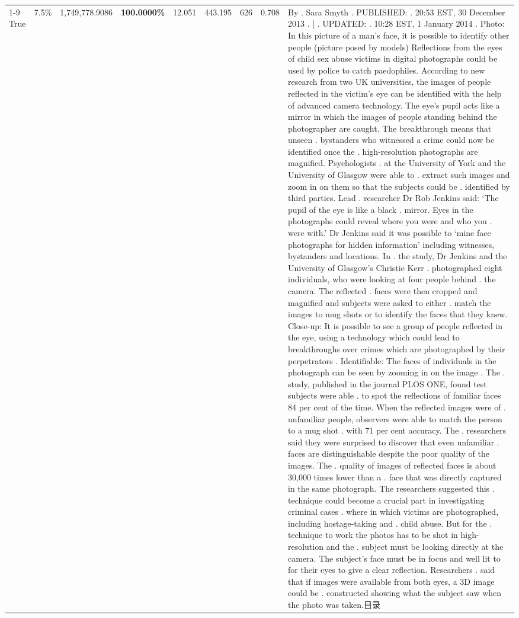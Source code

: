 \begin{table}[H]
\begin{tabular}{lllrlllll}
\cline{1-9}
True & 7.5\% & 1,749,778.9086 & \bfseries \color{red} 100.0000\% & 12.051 & 443.195 & 626 & 0.708 & By . Sara Smyth . PUBLISHED: . 20:53 EST, 30 December 2013 . | . UPDATED: . 10:28 EST, 1 January 2014 . Photo: In this picture of a man's face, it is possible to identify other people (picture posed by models) Reflections from the eyes of child sex abuse victims in digital photographs could be used by police to catch paedophiles. According to new research from two UK universities, the images of people reflected in the victim's eye can be identified with the help of advanced camera technology. The eye's pupil acts like a mirror in which the images of people standing behind the photographer are caught. The breakthrough means that unseen . bystanders who witnessed a crime could now be identified once the . high-resolution photographs are magnified. Psychologists . at the University of York and the University of Glasgow were able to . extract such images and zoom in on them so that the subjects could be . identified by third parties. Lead . researcher Dr Rob Jenkins said: ‘The pupil of the eye is like a black . mirror. Eyes in the photographs could reveal where you were and who you . were with.' Dr Jenkins said it was possible to ‘mine face photographs for hidden information' including witnesses, bystanders and locations. In . the study, Dr Jenkins and the University of Glasgow's Christie Kerr . photographed eight individuals, who were looking at four people behind . the camera. The reflected . faces were then cropped and magnified and subjects were asked to either . match the images to mug shots or to identify the faces that they knew. Close-up: It is possible to see a group of people reflected in the eye, using a technology which could lead to breakthroughs over crimes which are photographed by their perpetrators . Identifiable: The faces of individuals in the photograph can be seen by zooming in on the image . The . study, published in the journal PLOS ONE, found test subjects were able . to spot the reflections of familiar faces 84 per cent of the time. When the reflected images were of . unfamiliar people, observers were able to match the person to a mug shot . with 71 per cent accuracy. The . researchers said they were surprised to discover that even unfamiliar . faces are distinguishable despite the poor quality of the images. The . quality of images of reflected faces is about 30,000 times lower than a . face that was directly captured in the same photograph. The researchers suggested this . technique could become a crucial part in investigating criminal cases . where in which victims are photographed, including hostage-taking and . child abuse. But for the . technique to work the photos has to be shot in high-resolution and the . subject must be looking directly at the camera. The subject's face must be in focus and well lit to for their eyes to give a clear reflection. Researchers . said that if images were available from both eyes, a 3D image could be . constructed showing what the subject saw when the photo was taken.目录 \\

\end{tabular}
\end{table}
